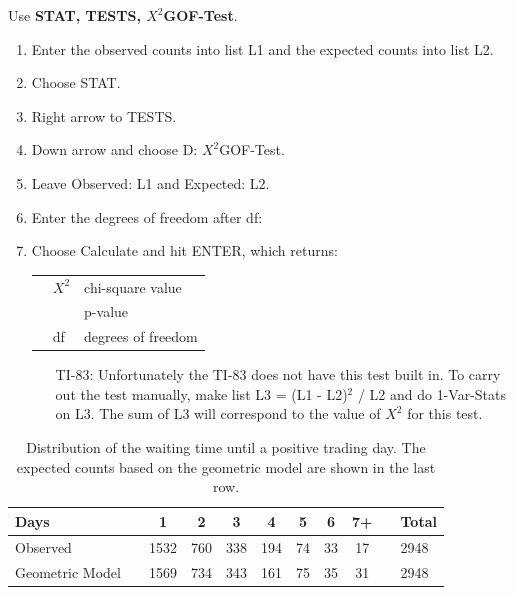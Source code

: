 \begin{termBox}{
Use \textbf{STAT, TESTS, $X^2$GOF-Test}.
\begin{enumerate}
\setlength{\itemsep}{0mm}
\item Enter the observed counts into list L1 and the expected counts into list L2.
\item Choose STAT.
\item Right arrow to TESTS.
\item Down arrow and choose D: $X^2$GOF-Test.
\item Leave Observed: L1 and Expected: L2.
\item Enter the degrees of freedom after df:
\item Choose Calculate and hit ENTER, which returns: \\
\begin{tabular}{l ll}
\hspace{3mm}&
	$X^2$
	&\quad chi-square value \\
&
	\text{p}
	&\quad p-value \\
&
	df
	&\quad  degrees of freedom
\end{tabular}
\begin{itemize}
\item[TI-83: ] Unfortunately the TI-83 does not have this test built in. To carry out the test manually, make list L3 = (L1 - L2)$^2$ / L2 and do 1-Var-Stats on L3. The sum of L3 will correspond to the value of $X^2$ for this test.
\end{itemize}
\end{enumerate}
}
\end{termBox}

\begin{table}[h]
\centering
\begin{tabular}{ll ccc ccc c ll}
\hline
Days	 & \hspace{1mm} & 1 & 2 & 3 & 4 & 5 & 6 & 7+ & \hspace{1mm} & Total \\
\hline
Observed &		& 1532 & 760 & 338 & 194 & 74 & 33 & 17 & & 2948 \\
Geometric Model &  & 1569 & 734 & 343 & 161 & 75 & 35 & 31 & & 2948 \\
\hline
\end{tabular}
\caption{Distribution of the waiting time until a positive trading day. The expected counts based on the geometric model are shown in the last row. }
\end{table}

